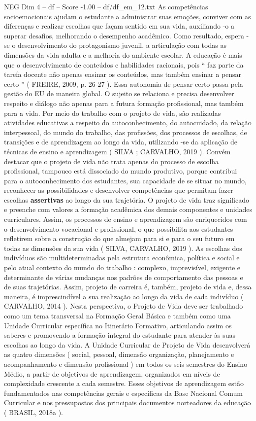 \begin{textsample}{NEG Dim 4 – df – Score -1.00 – df/df\_em\_12.txt}
As competências socioemocionais ajudam o estudante a administrar suas emoções, conviver com as diferenças e realizar escolhas que façam sentido em sua vida, auxiliando -o a superar desafios, melhorando o desempenho acadêmico.
Como resultado, espera -se o desenvolvimento do protagonismo juvenil, a articulação com todas as dimensões da vida adulta e a melhoria do ambiente escolar.
A educação é mais que o desenvolvimento de conteúdos e habilidades racionais, pois “ faz parte da tarefa docente não apenas ensinar os conteúdos, mas também ensinar a pensar certo ” ( FREIRE, 2009, p. 26-27 ).
Essa autonomia de pensar certo passa pela gestão do EU de maneira global.
O sujeito se relaciona e precisa desenvolver respeito e diálogo não apenas para a futura formação profissional, mas também para a vida.
Por meio do trabalho com o projeto de vida, são realizadas atividades educativas a respeito do autoconhecimento, do autocuidado, da relação interpessoal, do mundo do trabalho, das profissões, dos processos de escolhas, de transições e de aprendizagem ao longo da vida, utilizando -se da aplicação de técnicas de ensino e aprendizagem ( SILVA ; CARVALHO, 2019 ).
Convém destacar que o projeto de vida não trata apenas do processo de escolha profissional, tampouco está dissociado do mundo produtivo, porque contribui para o autoconhecimento dos estudantes, sua capacidade de se situar no mundo, reconhecer as possibilidades e desenvolver competências que permitam fazer escolhas \textbf{assertivas} ao longo da sua trajetória.
O projeto de vida traz significado e preenche com valores a formação acadêmica dos demais componentes e unidades curriculares.
Assim, os processos de ensino e aprendizagem são enriquecidos com o desenvolvimento vocacional e profissional, o que possibilita aos estudantes refletirem sobre a construção do que almejam para si e para o seu futuro em todas as dimensões da sua vida ( SILVA, CARVALHO, 2019 ).
As escolhas dos indivíduos são multideterminadas pela estrutura econômica, política e social e pelo atual contexto do mundo do trabalho : complexo, imprevisível, exigente e determinante de várias mudanças nos padrões de comportamento das pessoas e de suas trajetórias.
Assim, projeto de carreira é, também, projeto de vida e, dessa maneira, é imprescindível a sua realização ao longo da vida de cada indivíduo ( CARVALHO, 2014 ).
Nesta perspectiva, o Projeto de Vida deve ser trabalhado como um tema transversal na Formação Geral Básica e também como uma Unidade Curricular específica no Itinerário Formativo, articulando assim os saberes e promovendo a formação integral do estudante para atender às suas escolhas ao longo da vida.
A Unidade Curricular de Projeto de Vida desenvolverá as quatro dimensões ( social, pessoal, dimensão organização, planejamento e acompanhamento e dimensão profissional ) em todos os seis semestres do Ensino Médio, a partir de objetivos de aprendizagem, organizados em níveis de complexidade crescente a cada semestre.
Esses objetivos de aprendizagem estão fundamentados nas competências gerais e específicas da Base Nacional Comum Curricular e nos pressupostos dos principais documentos norteadores da educação ( BRASIL, 2018a ).

\end{textsample}
